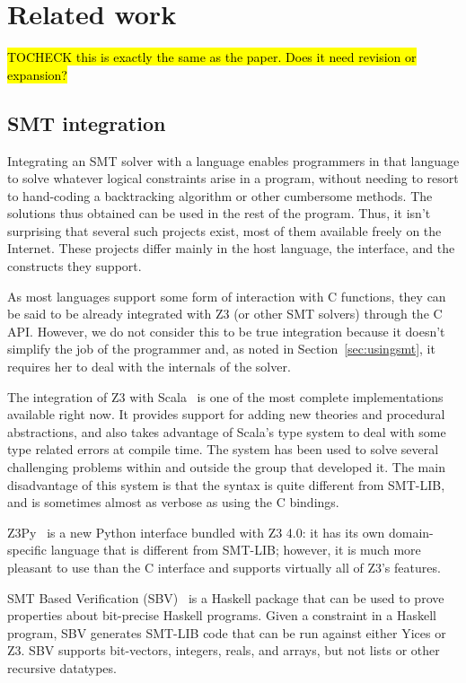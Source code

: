 \chapter{Related work}

\hl{TOCHECK this is exactly the same as the paper. Does it need revision or expansion?}

\section{SMT integration}

Integrating an SMT solver with a language enables programmers in that language
to solve whatever logical constraints arise in a program, without needing to
resort to hand-coding a backtracking algorithm or other cumbersome methods.
The solutions thus obtained can be used in the rest of the program. Thus, it
isn't surprising that several such projects exist, most of them available
freely on the Internet. These projects differ mainly in the host language, the
interface, and the constructs they support.

As most languages support some form of interaction with C functions, they can
be said to be already integrated with Z3 (or other SMT solvers) through the C
API. However, we do not consider this to be true integration because it
doesn't simplify the job of the programmer and, as noted in
Section~\ref{sec:usingsmt}, it requires her to deal with the internals of the
solver.

The integration of Z3 with Scala~\cite{scalaz3} is one of the most complete
implementations available right now. It provides support for adding new
theories and procedural abstractions, and also takes advantage of Scala's type
system to deal with some type related errors at compile time.  The system has
been used to solve several challenging problems within and outside the group
that developed it. The main disadvantage of this system is that the syntax is
quite different from SMT-LIB, and is sometimes almost as verbose as using the
C bindings.

Z3Py~\cite{z3py} is a new Python interface bundled with Z3 4.0: it has its own
domain-specific language that is different from SMT-LIB; however, it is
much more pleasant to use than the C interface and supports virtually all of
Z3's features.

SMT Based Verification (SBV)~\cite{sbv} is a Haskell package that can be used
to prove properties about bit-precise Haskell programs. Given a constraint in
a Haskell program, SBV generates SMT-LIB code that can be run against either
Yices or Z3. SBV supports bit-vectors, integers, reals, and arrays, but not
lists or other recursive datatypes.

